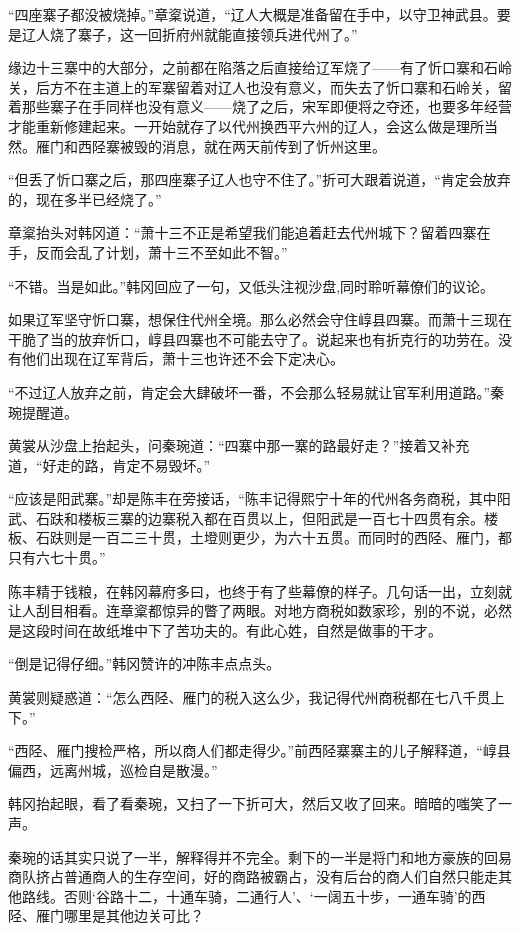 “四座寨子都没被烧掉。”章楶说道，“辽人大概是准备留在手中，以守卫神武县。要是辽人烧了寨子，这一回折府州就能直接领兵进代州了。”

缘边十三寨中的大部分，之前都在陷落之后直接给辽军烧了——有了忻口寨和石岭关，后方不在主道上的军寨留着对辽人也没有意义，而失去了忻口寨和石岭关，留着那些寨子在手同样也没有意义——烧了之后，宋军即便将之夺还，也要多年经营才能重新修建起来。一开始就存了以代州换西平六州的辽人，会这么做是理所当然。雁门和西陉寨被毁的消息，就在两天前传到了忻州这里。

“但丢了忻口寨之后，那四座寨子辽人也守不住了。”折可大跟着说道，“肯定会放弃的，现在多半已经烧了。”

章楶抬头对韩冈道：“萧十三不正是希望我们能追着赶去代州城下？留着四寨在手，反而会乱了计划，萧十三不至如此不智。”

“不错。当是如此。”韩冈回应了一句，又低头注视沙盘,同时聆听幕僚们的议论。

如果辽军坚守忻口寨，想保住代州全境。那么必然会守住崞县四寨。而萧十三现在干脆了当的放弃忻口，崞县四寨也不可能去守了。说起来也有折克行的功劳在。没有他们出现在辽军背后，萧十三也许还不会下定决心。

“不过辽人放弃之前，肯定会大肆破坏一番，不会那么轻易就让官军利用道路。”秦琬提醒道。

黄裳从沙盘上抬起头，问秦琬道：“四寨中那一寨的路最好走？”接着又补充道，“好走的路，肯定不易毁坏。”

“应该是阳武寨。”却是陈丰在旁接话，“陈丰记得熙宁十年的代州各务商税，其中阳武、石趺和楼板三寨的边寨税入都在百贯以上，但阳武是一百七十四贯有余。楼板、石趺则是一百二三十贯，土墱则更少，为六十五贯。而同时的西陉、雁门，都只有六七十贯。”

陈丰精于钱粮，在韩冈幕府多曰，也终于有了些幕僚的样子。几句话一出，立刻就让人刮目相看。连章楶都惊异的瞥了两眼。对地方商税如数家珍，别的不说，必然是这段时间在故纸堆中下了苦功夫的。有此心姓，自然是做事的干才。

“倒是记得仔细。”韩冈赞许的冲陈丰点点头。

黄裳则疑惑道：“怎么西陉、雁门的税入这么少，我记得代州商税都在七八千贯上下。”

“西陉、雁门搜检严格，所以商人们都走得少。”前西陉寨寨主的儿子解释道，“崞县偏西，远离州城，巡检自是散漫。”

韩冈抬起眼，看了看秦琬，又扫了一下折可大，然后又收了回来。暗暗的嗤笑了一声。

秦琬的话其实只说了一半，解释得并不完全。剩下的一半是将门和地方豪族的回易商队挤占普通商人的生存空间，好的商路被霸占，没有后台的商人们自然只能走其他路线。否则‘谷路十二，十通车骑，二通行人’、‘一阔五十步，一通车骑’的西陉、雁门哪里是其他边关可比？

